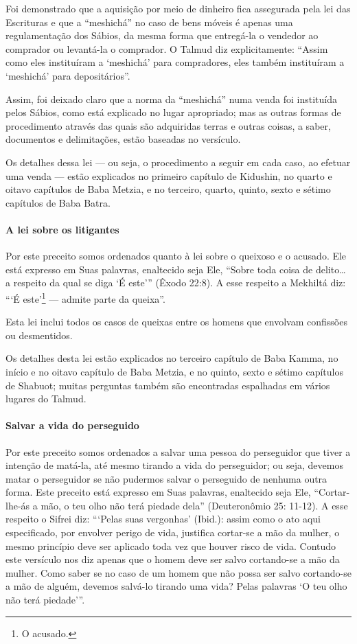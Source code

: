 Foi demonstrado que a aquisição por meio de dinheiro fica assegurada
pela lei das Escrituras e que a ``meshichá'' no caso de bens móveis é
apenas uma regulamentação dos Sábios, da mesma forma que entregá-la o
vendedor ao comprador ou levantá-la o comprador. O Talmud diz
explicitamente: ``Assim como eles instituíram a `meshichá' para
compradores, eles também instituíram a `meshichá' para depositários''.

Assim, foi deixado claro que a norma da ``meshichá'' numa venda foi
instituída pelos Sábios, como está explicado no lugar apropriado; mas as
outras formas de procedimento através das quais são adquiridas terras e
outras coisas, a saber, documentos e delimitações, estão baseadas no
versículo.

Os detalhes dessa lei --- ou seja, o procedimento a seguir em cada caso,
ao efetuar uma venda --- estão explicados no primeiro capítulo de
Kidushin, no quarto e oitavo capítulos de Baba Metzia, e no terceiro,
quarto, quinto, sexto e sétimo capítulos de Baba Batra.

\paragraph{A lei sobre os litigantes}

Por este preceito somos ordenados quanto à lei sobre o queixoso
e o acusado. Ele está expresso em Suas palavras, enaltecido seja Ele,
``Sobre toda coisa de delito\ldots{} a respeito da qual se diga `É este'''
(Êxodo 22:8). A esse respeito a Mekhiltá diz: ```É
este'\footnote{O acusado.} --- admite parte da queixa''.

Esta lei inclui todos os casos de queixas entre os homens que envolvam
confissões ou desmentidos.

Os detalhes desta lei estão explicados no terceiro capítulo de Baba
Kamma, no início e no oitavo capítulo de Baba Metzia, e no quinto, sexto
e sétimo capítulos de Shabuot; muitas perguntas também são encontradas
espalhadas em vários lugares do Talmud.

\paragraph{Salvar a vida do perseguido}

Por este preceito somos ordenados a salvar uma pessoa do perseguidor
que tiver a intenção de matá-la, até mesmo tirando a vida do
perseguidor; ou seja, devemos matar o perseguidor se não pudermos salvar
o perseguido de nenhuma outra forma. Este preceito está expresso em Suas
palavras, enaltecido seja Ele, ``Cortar-lhe-ás a mão, o teu olho não
terá piedade dela'' (Deuteronômio 25: 11-12). A esse respeito o Sifrei
diz: ```Pelas suas vergonhas' (Ibid.): assim como o ato aqui
especificado, por envolver perigo de vida, justifica cortar-se a mão da
mulher, o mesmo princípio deve ser aplicado toda vez que houver risco de
vida. Contudo este versículo nos diz apenas que o homem deve ser salvo
cortando-se a mão da mulher. Como saber se no caso de um homem que não
possa ser salvo cortando-se a mão de alguém, devemos salvá-lo tirando
uma vida? Pelas palavras `O teu olho não terá piedade'''.

